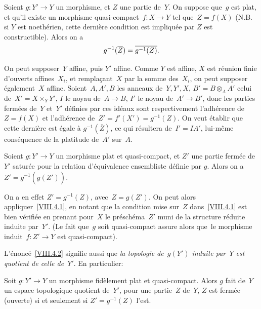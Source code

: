 \begin{theoreme}
\label{VIII.4.1}
Soient $g\colon Y'\to Y$ un morphisme, et $Z$ une partie de~$Y$. On
suppose que~$g$ est plat, et qu'il existe un morphisme
quasi-compact~$f\colon X\to Y$ tel que~$Z=f(X)$ (N.B. si $Y$ est
noeth\'erien, cette derni\`ere condition est impliqu\'ee par
\og $Z$ est constructible\fg). Alors on a
$$
g^{-1}(\overline{Z})=\overline{g^{-1}(Z)}.
$$
\end{theoreme}

On peut supposer~$Y$ affine, puis $Y'$ affine. Comme $Y$ est affine,
$X$ est r\'eunion
finie d'ouverts affines~$X_{i}$, et rempla\c cant~$X$ par la somme
des~$X_{i}$, on peut supposer \'egalement~$X$
affine. Soient~$A,A',B$ les anneaux de~$Y,Y',X$, $B'=B\otimes_{A}A'$
celui de~$X'=X\times_{Y}Y'$, $I$ le noyau de~$A\to B$, $I'$ le noyau
de~$A'\to B'$, donc les parties ferm\'ees de~$Y$ et~$Y'$
d\'efinies par ces id\'eaux sont respectivement l'adh\'erence
de~$Z=f(X)$ et l'adh\'erence de~$Z'=f'(X')=g^{-1}(Z)$. On veut
\'etablir que cette derni\`ere est \'egale \`a
$g^{-1}(\overline{Z})$, ce qui r\'esultera de~$I'=IA'$, lui-m\^eme
cons\'equence de la platitude de~$A'$ sur~$A$.

\begin{corollaire}
\label{VIII.4.2}
Soient $g\colon Y'\to Y$ un morphisme plat et quasi-compact, et $Z'$
une partie ferm\'ee de~$Y'$ satur\'ee pour la relation
d'\'equivalence ensembliste d\'efinie par $g$. Alors on a
$Z'=g^{-1}(\overline{g(Z')})$.
\end{corollaire}

\enlargethispage{.5cm}On a en effet $Z'=g^{-1}(Z)$, avec~$Z=g(Z')$. On peut alors
appliquer~\ref{VIII.4.1}, en notant que la condition mise sur~$Z$
dans~\ref{VIII.4.1} est bien v\'erifi\'ee en prenant pour~$X$ le
pr\'esch\'ema~$Z'$ muni de la structure r\'eduite induite
par~$Y'$. (Le fait que~$g$ soit quasi-compact assure alors que~le
morphisme induit~$f\colon Z'\to Y$ est quasi-compact).

L'\'enonc\'e~\ref{VIII.4.2} signifie aussi que \emph{la topologie
de~$g(Y')$ induite par~$Y$ est quotient de celle de~$Y'$}. En
particulier:

\begin{corollaire}
\label{VIII.4.3}
Soit $g\colon Y'\to Y$ un morphisme fid\`element plat et
quasi-compact. Alors $g$ fait de~$Y$ un espace topologique quotient
de~$Y'$, \ie pour une partie~$Z$ de~$Y$, $Z$ est ferm\'ee
(\resp ouverte) si et seulement si $Z'=g^{-1}(Z)$ l'est.
\end{corollaire}

